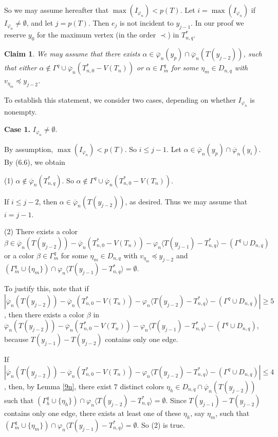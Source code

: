 \documentclass[11pt]{article}
\newtheorem{claim}{Claim}[section]
\newcommand{\phibar}{\overline{\varphi}}
\begin{document}
So we may assume hereafter that $\max(I_{\varphi_n})< p(T)$. Let $i=\max(I_{\varphi_n})$ if $I_{\varphi_n} \ne \emptyset$,
and let $j=p(T)$. Then $e_j$ is not incident to $y_{j-1}$. In our proof we reserve $y_0$ for the maximum vertex 
(in the order $\prec$) in $T_{n,q}^*$.  

\begin{claim}\label{j-1}
We may assume that there exists $\alpha\in\overline{\varphi}_n(y_p)\cap\overline{\varphi}_n(T(y_{j-2}))$, such that 
either $\alpha\notin\Gamma^q\cup \phibar_n(T_{n,0}^*-V(T_n))$ or $\alpha \in\Gamma^{q}_m$ for some $\eta_m\in D_{n,q}$ 
with $v_{\eta_m} \preceq y_{j-2}$.
\end{claim}

To establish this statement, we consider two cases, depending on whether $I_{\varphi_n}$ is nonempty. 

{\bf Case 1.} $I_{\varphi_n}\neq\emptyset$. 

By assumption, $\max(I_{\varphi_n})< p(T)$. So $i \le j-1$. Let $\alpha\in\overline{\varphi}_n(y_p)\cap
\overline{\varphi}_n(y_i)$. By (6.6), we obtain 

(1) $\alpha \notin \phibar_n(T_{n,q}^*)$. So $\alpha \notin \Gamma^{q}\cup \phibar_n(T_{n,0}^*-V(T_n))$. 

\noindent If $i\le j-2$, then $\alpha\in\phibar_n(T(y_{j-2}))$, as desired. Thus we may assume that $i=j-1$. 

(2) There exists a color $\beta \in \overline{\varphi}_n(T(y_{j-2}))- \phibar_n(T_{n,0}^*-V(T_n)) - \varphi_n \langle 
T(y_{j-1}) - T_{n,q}^* \rangle -(\Gamma^{q}\cup D_{n,q})$ or a color $\beta \in\Gamma^{q}_m$ for some $\eta_m\in D_{n,q}$ 
with $v_{\eta_m} \preceq y_{j-2}$ and $(\Gamma^{q}_m \cup \{\eta_m\}) \cap \varphi_n \langle T(y_{j-1}) - T_{n,q}^* 
\rangle=\emptyset$.

To justify this, note that if $|\overline{\varphi}_n(T(y_{j-2}))- \phibar_n(T_{n,0}^*-V(T_n)) - \varphi_n \langle 
T(y_{j-2}) - T_{n,q}^* \rangle -(\Gamma^{q}\cup D_{n,q}) |\ge  5$, then there exists a color $\beta$ in 
$\overline{\varphi}_n(T(y_{j-2}))- \phibar_n(T_{n,0}^*-V(T_n)) - \varphi_n \langle T(y_{j-1}) - T_{n,q}^* \rangle 
-(\Gamma^{q}\cup D_{n,q})$, because  $T(y_{j-1})-T(y_{j-2})$ contains only one edge.

If $|\overline{\varphi}_n(T(y_{j-2}))- \phibar_n(T_{n,0}^*-V(T_n)) - \varphi_n \langle 
T(y_{j-2}) - T_{n,q}^* \rangle -(\Gamma^{q}\cup D_{n,q}) |\le 4 $, then, by Lemma \ref{9n}, there exist $7$ distinct 
colors $\eta_{h}\in D_{n,q}\cap \phibar_n(T(y_{j-2}))$ such that  $(\Gamma^{q}_h \cup \{\eta_{h}\})
\cap \varphi_n \langle T(y_{j-2}) - T_{n,q}^* \rangle=\emptyset$. Since $T(y_{j-1})-T(y_{j-2})$ contains only one edge,
there exists at least one of these $\eta_{h}$, say $\eta_m$, such that $(\Gamma^{q}_m \cup \{\eta_{m}\})
\cap \varphi_n \langle T(y_{j-1}) - T_{n,q}^* \rangle=\emptyset$. So (2) is true. 
\end{document}
